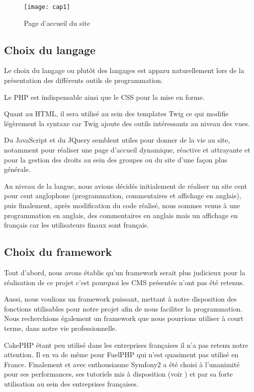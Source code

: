 \begin{figure}[ht]
\centering
\texttt{[image: cap1]}
\caption{Page d'accueil du site}
\label{fig:accueil_site}
\end{figure}


\subsection{Choix du langage}

Le choix du langage ou plutôt des langages est apparu naturellement lors de la présentation des différents outils de programmation.

Le PHP est indispensable ainsi que le CSS pour la mise en forme.

Quant au HTML, il sera utilisé au sein des templates Twig ce qui modifie légèrement la syntaxe car Twig ajoute des outils intéressants au niveau des vues.

Du JavaScript et du JQuery semblent utiles pour donner de la vie au site, notamment pour réaliser une page d'accueil dynamique, réactive et attrayante et pour la gestion des droits au sein des groupes ou du site d'une façon plus générale.

Au niveau de la langue, nous avions décidés initialement de réaliser un site cent pour cent anglophone (programmation, commentaires et affichage en anglais), puis finalement, après modification du code réalisé, nous sommes venus à une programmation en anglais, des commentaires en anglais mais un affichage en français car les utilisateurs finaux sont français.

\subsection{Choix du framework}

Tout d'abord, nous avons établis qu'un framework serait plus judicieux pour la réalisation de ce projet c'est pourquoi les CMS présentés n'ont pas été retenus.

Aussi, nous voulions un framework puissant, mettant à notre disposition des fonctions utilisables pour notre projet afin de nous faciliter la programmation. Nous recherchions également un framework que nous pourrions utiliser à court terme, dans notre vie professionnelle.

CakePHP étant peu utilisé dans les entreprises françaises il n'a pas retenu notre attention. Il en va de même pour FuelPHP qui n'est quasiment pas utilisé en France. Finalement et avec enthousiasme Symfony2 a été choisi à l'unanimité pour ses performances, ses tutoriels mis à disposition (voir \cite{tuto_symfony}) et par sa forte utilisation au sein des entreprises françaises.

